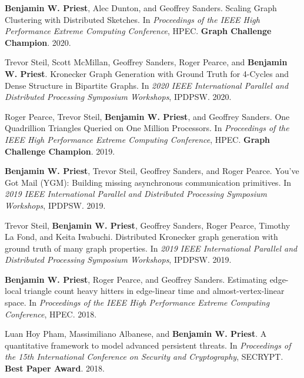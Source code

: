 \item \textbf{Benjamin W. Priest}, Alec Dunton, and Geoffrey Sanders.
	Scaling Graph Clustering with Distributed Sketches.
	In \emph{Proceedings of the IEEE High Performance Extreme Computing Conference}, 
	HPEC. 
	\textbf{Graph Challenge Champion}.
	2020.

\item Trevor Steil, Scott McMillan, Geoffrey Sanders, Roger Pearce, and \textbf{Benjamin W. Priest}.
	Kronecker Graph Generation with Ground Truth for 4-Cycles and Dense Structure in Bipartite Graphs.
	In \emph{2020 IEEE International Parallel and Distributed Processing Symposium Workshops}, 
	IPDPSW. 
	2020.

\item Roger Pearce, Trevor Steil, \textbf{Benjamin W. Priest}, and Geoffrey Sanders.
	One Quadrillion Triangles Queried on One Million Processors.
	In \emph{Proceedings of the IEEE High Performance Extreme Computing Conference}, 
	HPEC. 
	\textbf{Graph Challenge Champion}.
	2019.

\item \textbf{Benjamin W. Priest}, Trevor Steil, Geoffrey Sanders, and Roger Pearce.
	You've {G}ot {M}ail (YGM): Building missing asynchronous communication primitives.
	In \emph{2019 IEEE International Parallel and Distributed Processing Symposium Workshops}, 
	IPDPSW. 
	2019.

\item Trevor Steil, \textbf{Benjamin W. Priest}, Geoffrey Sanders, Roger Pearce, Timothy La Fond, and Keita Iwabuchi.
	Distributed Kronecker graph generation with ground truth of many graph properties.
	In \emph{2019 IEEE International Parallel and Distributed Processing Symposium Workshops}, 
	IPDPSW. 
	2019.

\item \textbf{Benjamin W. Priest}, Roger Pearce, and Geoffrey Sanders.
	Estimating edge-local triangle count heavy hitters in edge-linear time and almost-vertex-linear space.
	In \emph{Proceedings of the IEEE High Performance Extreme Computing Conference}, 
	HPEC. 
	2018.

\item Luan Hoy Pham, Massimiliano Albanese, and \textbf{Benjamin W. Priest}.
	A quantitative framework to model advanced persistent threats.
	In \emph{Proceedings of the 15th International Conference on Security and Cryptography}, 
	SECRYPT. 
	\textbf{Best Paper Award}.
	2018.
